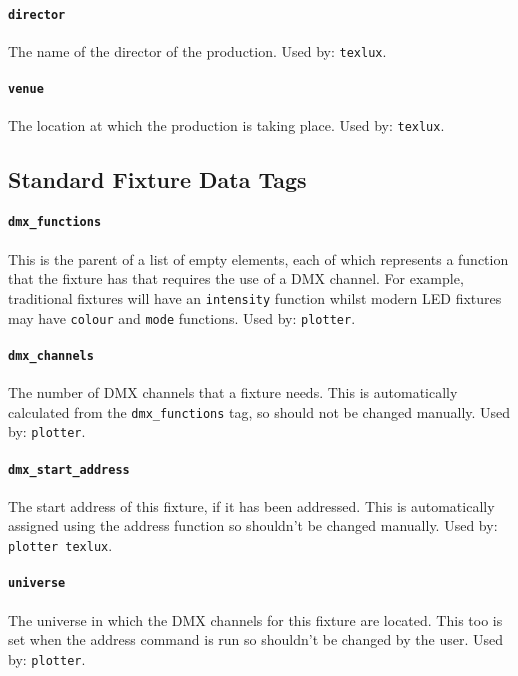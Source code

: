 \documentclass[a4paper]{article}
\begin{document}
\paragraph{\texttt{director}}
The name of the director of the production. Used by: \texttt{texlux}.

\paragraph{\texttt{venue}}
The location at which the production is taking place. Used by: 
\texttt{texlux}.

\subsection{Standard Fixture Data Tags} \label{sec:fixtags}

\paragraph{\texttt{dmx\_functions}}
This is the parent of a list of empty elements, each of which represents a 
function that the fixture has that requires the use of a DMX channel. For 
example, traditional fixtures will have an \texttt{intensity} function 
whilst modern LED fixtures may have \texttt{colour} and \texttt{mode} 
functions. Used by: \texttt{plotter}.

\paragraph{\texttt{dmx\_channels}}
The number of DMX channels that a fixture needs. This is automatically 
calculated from the \texttt{dmx\_functions} tag, so should not be changed 
manually. Used by: \texttt{plotter}.

\paragraph{\texttt{dmx\_start\_address}}
The start address of this fixture, if it has been addressed. This is 
automatically assigned using the address function so shouldn't be changed 
manually. Used by: \texttt{plotter texlux}.

\paragraph{\texttt{universe}}
The universe in which the DMX channels for this fixture are located. This too 
is set when the address command is run so shouldn't be changed by the user. 
Used by: \texttt{plotter}.
\end{document}

